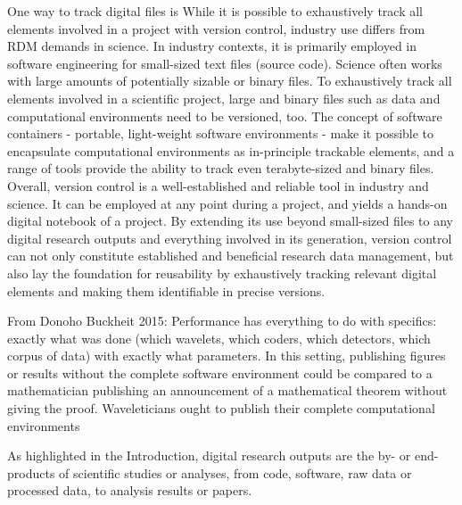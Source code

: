 

\pagebreak


One way to track digital files is
While it is possible to exhaustively track all elements involved in a project with version control, industry use differs from RDM demands in science.
In industry contexts, it is primarily employed in software engineering for small-sized text files (source code). Science often works with large amounts of potentially sizable or binary files.
To exhaustively track all elements involved in a scientific project, large and binary files such as data and computational environments need to be versioned, too.
The concept of software containers - portable, light-weight software environments - make it possible to encapsulate computational environments as in-principle trackable elements, and a range of tools provide the ability to track even terabyte-sized and binary files.
Overall, version control is a well-established and reliable tool in industry and science. It can be employed at any point during a project, and yields a hands-on digital notebook of a project.
By extending its use beyond small-sized files to any digital research outputs and everything involved in its generation, version control can not only constitute established and beneficial research data management, but also lay the foundation for reusability by exhaustively tracking relevant digital elements and making them identifiable in precise versions.

From Donoho Buckheit 2015: Performance has everything to do with specifics: exactly what was done (which wavelets,
which coders, which detectors, which corpus of data) with exactly what parameters. In
this setting, publishing figures or results without the complete software environment could
be compared to a mathematician publishing an announcement of a mathematical theorem
without giving the proof. Waveleticians ought to publish their complete computational
environments


As highlighted in the Introduction, digital research outputs are the by- or end-products of scientific studies or analyses, from code, software, raw data or processed data, to analysis results or papers.
